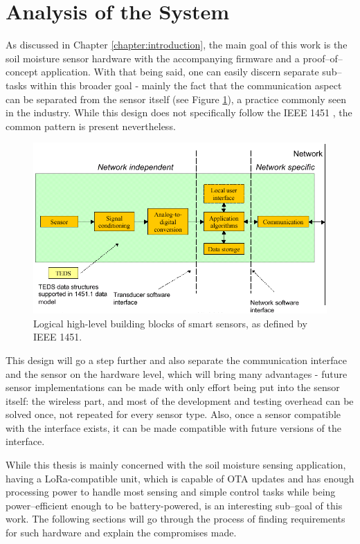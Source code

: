 
\section{Analysis of the System}
As discussed in Chapter \ref{chapter:introduction}, the main goal of this work is the soil moisture sensor hardware with the accompanying firmware and a proof--of--concept application. With that being said, one can easily discern separate sub--tasks within this broader goal - mainly the fact that the communication aspect can be separated from the sensor itself (see Figure \ref{fig:device-split}), a practice commonly seen in the industry. While this design does not specifically follow the IEEE 1451 \cite{mark_ieee_nodate}, the common pattern is present nevertheless.

\begin{figure}
    \includegraphics[width=\textwidth]{fig/ieee-1451.png}
    \caption{\label{fig:device-split}Logical high-level building blocks of smart sensors, as defined by IEEE 1451.}
\end{figure}

This design will go a step further and also separate the communication interface and the sensor on the hardware level, which will bring many advantages - future sensor implementations can be made with only effort being put into the sensor itself: the wireless part, and most of the development and testing overhead can be solved once, not repeated for every sensor type. Also, once a sensor compatible with the interface exists, it can be made compatible with future versions of the interface.

While this thesis is mainly concerned with the soil moisture sensing application, having a LoRa-compatible unit, which is capable of OTA updates and has enough processing power to handle most sensing and simple control tasks while being power--efficient enough to be battery-powered, is an interesting sub--goal of this work. The following sections will go through the process of finding requirements for such hardware and explain the compromises made.

